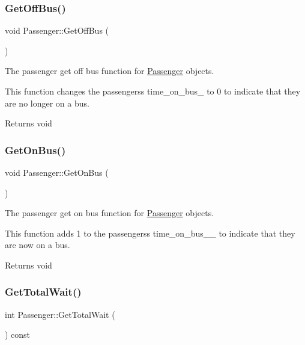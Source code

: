 \subsubsection{\texorpdfstring{Get\+Off\+Bus()}{GetOffBus()}}
{\footnotesize\ttfamily void Passenger\+::\+Get\+Off\+Bus (\begin{DoxyParamCaption}{ }\end{DoxyParamCaption})}



The passenger get off bus function for \hyperlink{classPassenger}{Passenger} objects. 

This function changes the passengers\textquotesingle{}s time\+\_\+on\+\_\+bus\+\_\+ to 0 to indicate that they are no longer on a bus.

\begin{DoxyReturn}{Returns}
void 
\end{DoxyReturn}
\mbox{\label{classPassenger_ae2ba639cfef39781ac079778578bd9fe}} 
\subsubsection{\texorpdfstring{Get\+On\+Bus()}{GetOnBus()}}
{\footnotesize\ttfamily void Passenger\+::\+Get\+On\+Bus (\begin{DoxyParamCaption}{ }\end{DoxyParamCaption})}



The passenger get on bus function for \hyperlink{classPassenger}{Passenger} objects. 

This function adds 1 to the passengers\textquotesingle{}s time\+\_\+on\+\_\+bus\+\_\+\+\_\+ to indicate that they are now on a bus.

\begin{DoxyReturn}{Returns}
void 
\end{DoxyReturn}
\mbox{\label{classPassenger_a25158560f790ef7ef06d94c414b34f25}} 
\subsubsection{\texorpdfstring{Get\+Total\+Wait()}{GetTotalWait()}}
{\footnotesize\ttfamily int Passenger\+::\+Get\+Total\+Wait (\begin{DoxyParamCaption}{ }\end{DoxyParamCaption}) const}



